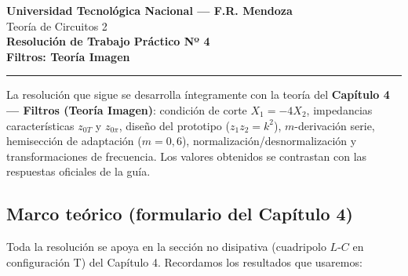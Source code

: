 \documentclass[class=article, crop=false, oneside]{standalone}
\begin{document}
\begin{center}
    {\Large\bfseries Universidad Tecnológica Nacional --- F.R. Mendoza}\\[2pt]
    {\large Teoría de Circuitos 2}\\[10pt]
    {\huge\bfseries\color{utnblue} Resolución de Trabajo Práctico Nº 4}\\[4pt]
    {\LARGE\bfseries Filtros: Teoría Imagen}\\[10pt]
\end{center}

\vspace{0.5ex}
\hrule
\vspace{1ex}

\begin{nota}
La resolución que sigue se desarrolla íntegramente con la teoría del
\textbf{Capítulo 4 --- Filtros (Teoría Imagen)}: condición de corte
$X_1=-4X_2$, impedancias características $z_{0T}$ y $z_{0\pi}$, diseño del
prototipo ($z_1 z_2 = k^2$), $m$-derivación serie, hemisección de adaptación
($m=0{,}6$), normalización/desnormalización y transformaciones de frecuencia.
Los valores obtenidos se contrastan con las respuestas oficiales de la guía.
\end{nota}

\subsection*{Marco teórico (formulario del Capítulo 4)}

Toda la resolución se apoya en la sección no disipativa (cuadripolo $L$-$C$ en
configuración T) del Capítulo 4. Recordamos los resultados que usaremos:
\end{document}

